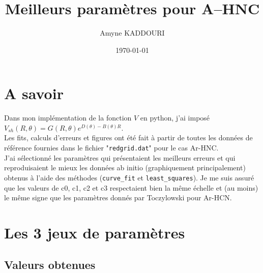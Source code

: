 \documentclass[10pt,a4paper]{article}
\title{\textbf{Meilleurs paramètres pour A--HNC}}
\author{Amyne KADDOURI}
\date{\today}
\begin{document}
\maketitle

\tableofcontents
\newpage


\section{A savoir}

Dans mon implémentation de la fonction $V$ en python, j'ai imposé 
$V_{sh}(R,\theta)=G(R,\theta)e^{D(\theta)-B(\theta)R}$.\\

Les fits, calculs d'erreurs et figures ont été fait à partir de toutes les 
données de référence fournies dans le fichier "\verb|redgrid.dat|" pour le cas
Ar-HNC.\\

J'ai sélectionné les paramètres qui présentaient les meilleurs erreurs et qui
reproduisaient le mieux les données ab initio (graphiquement principalement)
obtenus à l'aide des méthodes (\verb|curve_fit| et \verb|least_squares|).
Je me suis assuré que les valeurs de c0, c1, c2 et c3 respectaient bien la
même échelle et (au moins) le même signe que les paramètres donnés par 
Toczylowski pour Ar-HCN.\\

\section{Les 3 jeux de paramètres}

\subsection{Valeurs obtenues}
\end{document}
